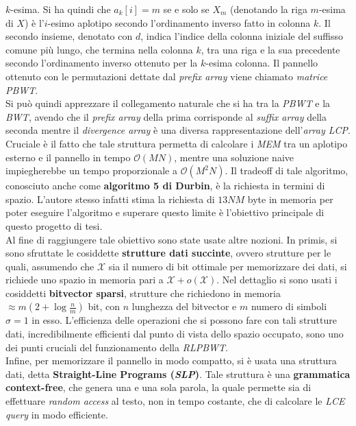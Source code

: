 \documentclass[a4paper,11pt, oneside,italian]{article}
\begin{document}
$k$-esima. Si ha quindi che $a_k[i]=m$ se e solo se $X_m$ 
(denotando la riga $m$-esima di $X$) è l'$i$-esimo aplotipo secondo
l'ordinamento inverso fatto in colonna $k$. Il secondo insieme, denotato con
$d$, indica l'indice della colonna iniziale del suffisso comune più lungo, che
termina nella colonna $k$, tra una riga e la sua precedente secondo
l'ordinamento inverso ottenuto per la $k$-esima colonna. Il pannello ottenuto
con le permutazioni dettate dal \textit{prefix array} viene chiamato
\textit{matrice PBWT}.\\
Si può quindi apprezzare il collegamento naturale che si ha tra la \textit{PBWT}
e la \textit{BWT}, avendo che il \textit{prefix array} della prima corrisponde
al \textit{suffix array} della seconda mentre il \textit{divergence array} è una
  diversa rappresentazione dell'\textit{array LCP}. \\ 
Cruciale è il fatto che tale struttura permetta di calcolare i \textit{MEM} tra
un aplotipo esterno e il pannello in tempo $\mathcal{O}(MN)$, mentre 
una 
soluzione naive impiegherebbe un tempo proporzionale a $\mathcal{O}(M^2N)$. Il
tradeoff di tale algoritmo, conosciuto anche come \textbf{algoritmo 5 di
  Durbin}, è la richiesta in termini di spazio. L'autore stesso infatti stima la
richiesta di $13NM$ byte in memoria per poter eseguire l'algoritmo e superare
questo limite è l'obiettivo principale di questo progetto di tesi.\\
Al fine di raggiungere tale obiettivo sono state usate altre nozioni. In primis,
si sono sfruttate le cosiddette \textbf{strutture dati succinte}, ovvero
strutture per le quali, assumendo che $\mathcal{X}$ sia il numero di bit
ottimale per memorizzare dei dati, si richiede uno spazio in memoria pari a
$\mathcal{X}+o(\mathcal{X})$. Nel dettaglio si sono usati i cosiddetti
\textbf{bitvector sparsi}, strutture che richiedono in memoria $\approx
m\left(2+\log\frac{n}{m}\right)$ bit, con $n$ lunghezza del bitvector e $m$
numero di simboli $\sigma=1$ in esso. L'efficienza delle operazioni che si
possono fare con tali strutture dati, incredibilmente efficienti dal punto di
vista dello spazio occupato, sono uno dei punti cruciali del funzionamento della
\textit{RLPBWT}.\\
Infine, per memorizzare il pannello in modo compatto, si è usata una
struttura dati, detta \textbf{Straight-Line Programs (\textit{SLP})}. Tale
struttura è una \textbf{grammatica context-free}, che
genera una e una sola parola, la quale permette sia di effettuare \textit{random
access} al testo, non in tempo costante, che di calcolare le \textit{LCE
query} in modo efficiente. 
\end{document}
